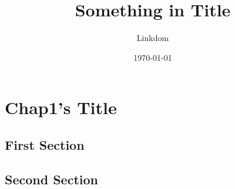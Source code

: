 \documentclass{article}
\title{Something in Title}
\author{Linkdom}
\date{\today}
\begin{document}
\maketitle
\else
\chapter{Chap1's Title}
\fi

\section{First Section}
\section{Second Section}


\ifx\allfiles\undefined
\end{document}
